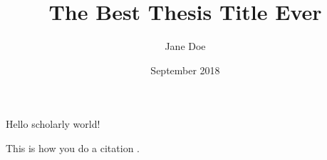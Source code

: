 \documentclass{article}
\title{The Best Thesis Title Ever}
\author{Jane Doe}
\date{September 2018}
\begin{document}
   \maketitle
   Hello scholarly world!
   
   This is how you do a citation \cite{MartinP2001}.
   


\end{document}
